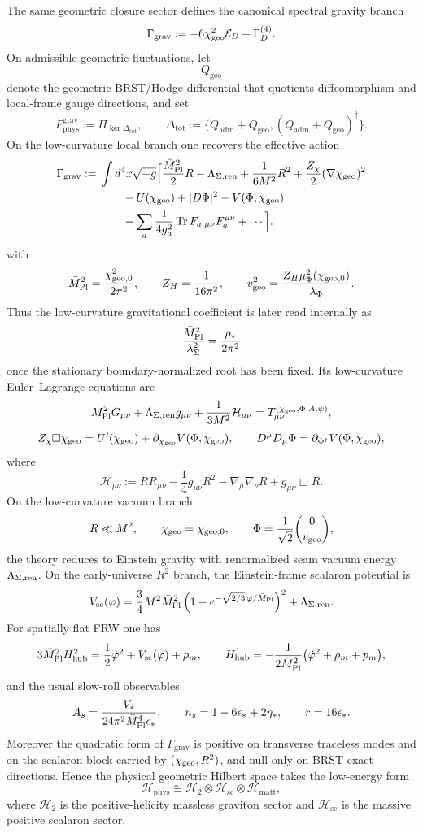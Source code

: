 
\begin{theorem}
\label{thm:gravity-cosmology-closure}
The same geometric closure sector defines the canonical spectral gravity branch
\[
\Gamma_{\mathrm{grav}}
:=
-6\chi_{\mathrm{geo}}^2\mathcal E_D+\Gamma_D^{(4)}.
\]
On admissible geometric fluctuations, let
\[
Q_{\mathrm{geo}}
\]
denote the geometric BRST/Hodge differential that quotients diffeomorphism and local-frame gauge
directions, and set
\[
P_{\mathrm{phys}}^{\mathrm{grav}}
:=
\Pi_{\ker\Delta_{\mathrm{tot}}},
\qquad
\Delta_{\mathrm{tot}}
:=
\{Q_{\mathrm{adm}}+Q_{\mathrm{geo}},(Q_{\mathrm{adm}}+Q_{\mathrm{geo}})^\dagger\}.
\]
On the low-curvature local branch one recovers the effective action
\[
\begin{aligned}
\Gamma_{\mathrm{grav}}
:={}&
\int d^4x\sqrt{-g}\Big[
\frac{\bar M_{\mathrm{Pl}}^2}{2}R
-\Lambda_{\Sigma,\mathrm{ren}}
+\frac{1}{6M^2}R^2
+\frac{Z_\chi}{2}(\nabla\chi_{\mathrm{geo}})^2
\\
&\qquad
-U(\chi_{\mathrm{geo}})
+|D\Phi|^2
-V(\Phi,\chi_{\mathrm{geo}})
\\
&\qquad
-\sum_a \frac{1}{4g_a^2}\operatorname{Tr} F_{a,\mu\nu}F_a^{\mu\nu}
+\cdots
\Big].
\end{aligned}
\]
with
\[
\bar M_{\mathrm{Pl}}^2=\frac{\chi_{\mathrm{geo},0}^2}{2\pi^2},
\qquad
Z_H=\frac{1}{16\pi^2},
\qquad
v_{\mathrm{geo}}^2=\frac{Z_H\mu_\Phi^2(\chi_{\mathrm{geo},0})}{\lambda_\Phi}.
\]
Thus the low-curvature gravitational coefficient is later read internally as
\[
\frac{\bar M_{\mathrm{Pl}}^2}{\lambda_\Sigma^2}=\frac{\rho_\star}{2\pi^2}
\]
once the stationary boundary-normalized root has been fixed.
Its low-curvature Euler--Lagrange equations are
\[
\bar M_{\mathrm{Pl}}^2 G_{\mu\nu}
+\Lambda_{\Sigma,\mathrm{ren}} g_{\mu\nu}
+\frac{1}{3M^2}\mathcal H_{\mu\nu}
=
T_{\mu\nu}^{(\chi_{\mathrm{geo}},\Phi,A,\psi)},
\]
\[
Z_\chi\Box\chi_{\mathrm{geo}}=U'(\chi_{\mathrm{geo}})+\partial_{\chi_{\mathrm{geo}}}V(\Phi,\chi_{\mathrm{geo}}),
\qquad
D^\mu D_\mu\Phi=\partial_{\Phi^\dagger}V(\Phi,\chi_{\mathrm{geo}}),
\]
where
\[
\mathcal H_{\mu\nu}
:=
RR_{\mu\nu}
-\frac14 g_{\mu\nu}R^2
-\nabla_\mu\nabla_\nu R
+g_{\mu\nu}\Box R.
\]
On the low-curvature vacuum branch
\[
R\ll M^2,
\qquad
\chi_{\mathrm{geo}}=\chi_{\mathrm{geo},0},
\qquad
\Phi=\frac{1}{\sqrt2}\binom{0}{v_{\mathrm{geo}}},
\]
the theory reduces to Einstein gravity with renormalized seam vacuum energy $\Lambda_{\Sigma,\mathrm{ren}}$.
On the early-universe $R^2$ branch, the Einstein-frame scalaron potential is
\[
V_{\mathrm{sc}}(\varphi)
=
\frac34 M^2\bar M_{\mathrm{Pl}}^2
\left(1-e^{-\sqrt{2/3}\,\varphi/\bar M_{\mathrm{Pl}}}\right)^2
+\Lambda_{\Sigma,\mathrm{ren}}.
\]
For spatially flat FRW one has
\[
3\bar M_{\mathrm{Pl}}^2H_{\mathrm{hub}}^2
=
\frac12\dot\varphi^2+V_{\mathrm{sc}}(\varphi)+\rho_m,
\qquad
\dot{H_{\mathrm{hub}}}
=
-\frac{1}{2\bar M_{\mathrm{Pl}}^2}\bigl(\dot\varphi^2+\rho_m+p_m\bigr),
\]
and the usual slow-roll observables
\[
A_s=\frac{V_*}{24\pi^2\bar M_{\mathrm{Pl}}^4\epsilon_*},
\qquad
n_s=1-6\epsilon_*+2\eta_*,
\qquad
r=16\epsilon_*.
\]
Moreover the quadratic form of $\Gamma_{\mathrm{grav}}$ is positive on transverse traceless modes
and on the scalaron block carried by $(\chi_{\mathrm{geo}},R^2)$, and null only on BRST-exact directions.
Hence the physical geometric Hilbert space takes the low-energy form
\[
\mathcal H_{\mathrm{phys}}
\cong
\mathcal H_{2}\otimes\mathcal H_{\mathrm{sc}}\otimes\mathcal H_{\mathrm{matt}},
\]
where $\mathcal H_{2}$ is the positive-helicity massless graviton sector and
$\mathcal H_{\mathrm{sc}}$ is the massive positive scalaron sector.
\end{theorem}

